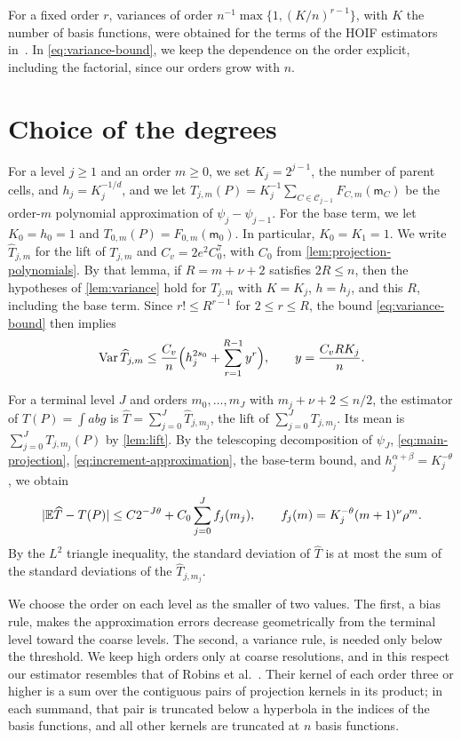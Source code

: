 For a fixed order $r$, variances of order $n^{-1}\max\{1,(K/n)^{r-1}\}$,
with $K$ the number of basis functions, were obtained for the terms of
the HOIF estimators in~\cite[Theorems~3.20--3.21]{hoif2008}. In
\eqref{eq:variance-bound}, we keep the dependence on the order explicit,
including the factorial, since our orders grow with $n$.

\section{Choice of the degrees}\label{sec:tuning}

For a level $j\ge1$ and an order $m\ge0$, we set $K_j=2^{j-1}$, the number
of parent cells, and $h_j=K_j^{-1/d}$, and we let
$T_{j,m}(P)=K_j^{-1}\sum_{C\in\mathcal C_{j-1}}F_{C,m}(\mathsf m_C)$ be the
order-$m$ polynomial approximation of $\psi_j-\psi_{j-1}$. For the base
term, we let $K_0=h_0=1$ and $T_{0,m}(P)=F_{0,m}(\mathsf m_0)$. In
particular, $K_0=K_1=1$. We write $\widehat T_{j,m}$ for the lift of
$T_{j,m}$ and $C_v=2e^2C_0^7$, with $C_0$ from
\cref{lem:projection-polynomials}. By that lemma, if $R=m+\nu+2$
satisfies $2R\le n$, then the hypotheses of \cref{lem:variance} hold
for $T_{j,m}$ with $K=K_j$, $h=h_j$, and this $R$, including the base
term. Since
$r!\le R^{r-1}$ for $2\le r\le R$, the bound \eqref{eq:variance-bound}
then implies
\begin{equation}\label{up:variance-levels}
 \operatorname{Var}\widehat T_{j,m}\le\frac{C_v}n
 \Bigl(h_j^{2s_0}+\sum_{r=1}^{R-1}y^r\Bigr),\qquad
 y=\frac{C_vRK_j}n.
\end{equation}

For a terminal level $J$ and orders $m_0,\ldots,m_J$ with
$m_j+\nu+2\le n/2$, the estimator of $T(P)=\int abg$ is
$\widehat T=\sum_{j=0}^J\widehat T_{j,m_j}$, the lift of
$\sum_{j=0}^JT_{j,m_j}$. Its mean is $\sum_{j=0}^JT_{j,m_j}(P)$ by
\cref{lem:lift}. By the telescoping decomposition of $\psi_J$,
\eqref{eq:main-projection}, \eqref{eq:increment-approximation}, the
base-term bound, and $h_j^{\alpha+\beta}=K_j^{-\theta}$, we obtain
\begin{equation}\label{eq:bias-levels}
 |\mathbb E\widehat T-T(P)|\le C2^{-J\theta}
   +C_0\sum_{j=0}^Jf_j(m_j),\qquad f_j(m)=K_j^{-\theta}(m+1)^\nu\rho^m.
\end{equation}
By the $L^2$ triangle inequality, the standard deviation of $\widehat T$ is
at most the sum of the standard deviations of the $\widehat T_{j,m_j}$.

We choose the order on each level as the smaller of two values. The
first, a bias rule, makes the approximation errors decrease geometrically
from the terminal level toward the coarse levels. The second, a variance
rule, is needed only below the threshold. We keep high orders only at
coarse resolutions, and in this respect our estimator resembles that of
Robins et al.~\cite[Section~9, (9.6)]{robins}. Their kernel of each order
three or higher is a sum over the contiguous pairs of projection kernels
in its product; in each summand, that pair is truncated below a
hyperbola in the indices of the basis functions, and all other kernels
are truncated at $n$ basis functions.

